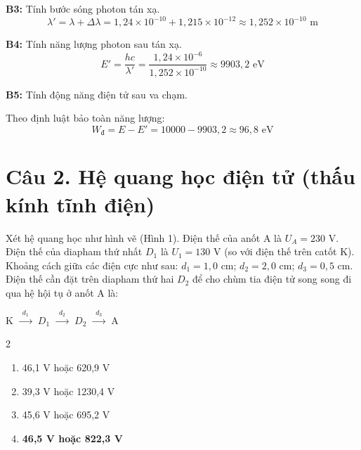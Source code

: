 \documentclass[11pt,a4paper]{article}
\begin{document}
\textbf{B3:} Tính bước sóng photon tán xạ.
\begin{equation*}
    \lambda' = \lambda + \Delta\lambda = 1{,}24 \times 10^{-10} + 1{,}215 \times 10^{-12} \approx 1{,}252 \times 10^{-10} \text{ m}
\end{equation*}

\textbf{B4:} Tính năng lượng photon sau tán xạ.
\begin{equation*}
    E' = \frac{hc}{\lambda'} = \frac{1{,}24 \times 10^{-6}}{1{,}252 \times 10^{-10}} \approx 9903{,}2 \text{ eV}
\end{equation*}

\textbf{B5:} Tính động năng điện tử sau va chạm.

Theo định luật bảo toàn năng lượng:
\begin{equation*}
    W_{\text{đ}} = E - E' = 10000 - 9903{,}2 \approx 96{,}8 \text{ eV}
\end{equation*}

\vspace{0.5cm}

\section*{Câu 2. Hệ quang học điện tử (thấu kính tĩnh điện)}

Xét hệ quang học như hình vẽ (Hình 1). Điện thế của anốt A là $U_A = 230$ V. Điện thế của diapham thứ nhất $D_1$ là $U_1 = 130$ V (so với điện thế trên catốt K). Khoảng cách giữa các điện cực như sau: $d_1 = 1{,}0$ cm; $d_2 = 2{,}0$ cm; $d_3 = 0{,}5$ cm. Điện thế cần đặt trên diapham thứ hai $D_2$ để cho chùm tia điện tử song song đi qua hệ hội tụ ở anốt A là:

\begin{center}
    K \quad $\xrightarrow{~~d_1~~}$ \quad $D_1$ \quad $\xrightarrow{~~d_2~~}$ \quad $D_2$ \quad $\xrightarrow{~~d_3~~}$ \quad A
\end{center}

\begin{multicols}{2}
\begin{enumerate}[label=\Alph*., itemsep=1pt, topsep=1pt, parsep=0pt, leftmargin=1.8em]
    \item 46,1 V hoặc 620,9 V
    \item 39,3 V hoặc 1230,4 V
    \item 45,6 V hoặc 695,2 V
    \item \textbf{46,5 V hoặc 822,3 V}
\end{enumerate}
\end{multicols}
\end{document}
